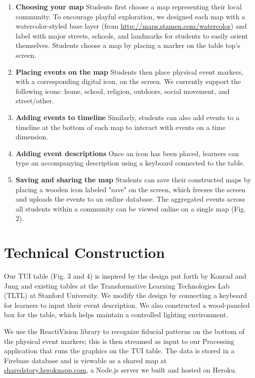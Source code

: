 \documentclass{sigchi-ext}
\begin{document}
\begin{enumerate}\compresslist
	\item \textbf{Choosing your map} Students first choose a map representing their local community. To encourage playful exploration, we designed each map with a watercolor-styled base layer (from \url{http://maps.stamen.com/watercolor}) and label with major streets, schools, and landmarks for students to easily orient themselves. Students choose a map by placing a marker on the table top's screen.

	\item \textbf{Placing events on the map} Students then place physical event markers, with a corresponding digital icon, on the screen. We currently support the following icons: home, school, religion, outdoors, social movement, and street/other.

	\item \textbf{Adding events to timeline} Similarly, students can also add events to a timeline at the bottom of each map to interact with events on a time dimension.

	\item \textbf{Adding event descriptions} Once an icon has been placed, learners can type an accompanying description using a keyboard connected to the table.

	\item \textbf{Saving and sharing the map} Students can save their constructed maps by placing a wooden icon labeled "save" on the screen, which freezes the screen and uploads the events to an online database. The aggregated events across all students within a community can be viewed online on a single map (Fig. 2).
\end{enumerate}

\section{Technical Construction}

Our TUI table (Fig. 3 and 4) is inspired by the design put forth by Konrad and Jung and existing tables at the Transformative Learning Technologies Lab (TLTL) at Stanford University. We modify the design by connecting a keyboard for learners to input their event description. We also constructed a wood-paneled box for the table, which helps maintain a controlled lighting environment.

We use the ReactiVision library to recognize fiducial patterns on the bottom of the physical event markers; this is then streamed as input to our Processing application that runs the graphics on the TUI table. The data is stored in a Firebase database and is viewable as a shared map at \url{sharedstory.herokuapp.com}, a Node.js server we built and hosted on Heroku.
\end{document}
